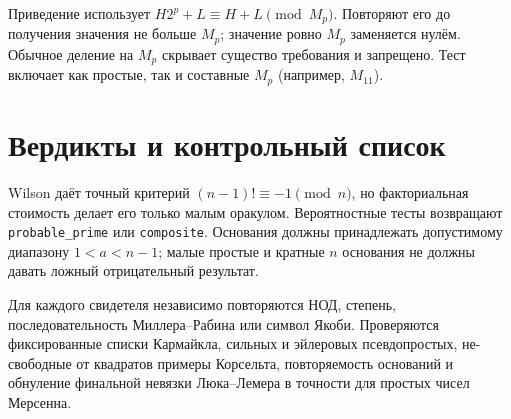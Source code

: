 \documentclass[12pt]{ca-capstone}
\begin{document}
Приведение использует $H2^p+L\equiv H+L\pmod{M_p}$. Повторяют его до получения значения не
больше $M_p$; значение ровно $M_p$ заменяется нулём. Обычное деление на $M_p$ скрывает существо
требования и запрещено. Тест включает как простые, так и составные $M_p$ (например, $M_{11}$).

\clearpage
\section{Вердикты и контрольный список}
Wilson даёт точный критерий $(n-1)!\equiv-1\pmod n$, но факториальная стоимость делает его
только малым оракулом. Вероятностные тесты возвращают \texttt{probable\_prime} или
\texttt{composite}. Основания должны принадлежать допустимому диапазону $1<a<n-1$; малые простые
и кратные $n$ основания не должны давать ложный отрицательный результат.

Для каждого свидетеля независимо повторяются НОД, степень, последовательность Миллера--Рабина
или символ Якоби. Проверяются фиксированные списки Кармайкла, сильных и эйлеровых псевдопростых,
не-свободные от квадратов примеры Корсельта, повторяемость оснований и обнуление финальной
невязки Люка--Лемера в точности для простых чисел Мерсенна.

\end{document}
